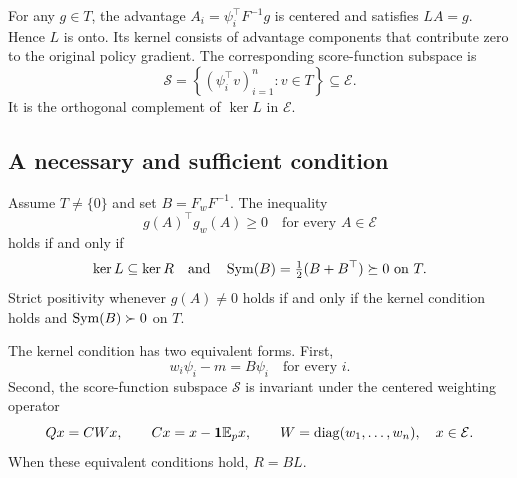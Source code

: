 For any $g\in T$, the advantage $A_i=\psi_i^\top F^{-1}g$ is centered and satisfies $LA=g$. Hence $L$ is onto. Its kernel consists of advantage components that contribute zero to the original policy gradient. The corresponding score-function subspace is
\[
\mathcal S=\left\{(\psi_i^\top v)_{i=1}^n:v\in T\right\}\subseteq\mathcal E.
\]
It is the orthogonal complement of $\ker L$ in $\mathcal E$.

\subsection{A necessary and sufficient condition}

\begin{theorem}
\label{thm:euclidean}
Assume $T\ne\{0\}$ and set $B=F_wF^{-1}$. The inequality
\begin{equation}
g(A)^\top g_w(A)\ge0\quad\text{for every }A\in\mathcal E
\label{eq:universal-alignment}
\end{equation}
holds if and only if
\begin{equation}
\ker L\subseteq\ker R
\quad\text{and}\quad
\operatorname{Sym}(B)=\tfrac12(B+B^\top)\succeq0\text{ on }T.
\label{eq:alignment-criterion}
\end{equation}
Strict positivity whenever $g(A)\ne0$ holds if and only if the kernel condition holds and $\operatorname{Sym}(B)\succ0$ on $T$.

The kernel condition has two equivalent forms. First,
\begin{equation}
w_i\psi_i-m=B\psi_i\quad\text{for every }i.
\label{eq:score-identity}
\end{equation}
Second, the score-function subspace $\mathcal S$ is invariant under the centered weighting operator
\[
Qx=CWx,\qquad Cx=x-\mathbf1\mathbb{E}_p x,\qquad W=\operatorname{diag}(w_1,\ldots,w_n),\quad x\in\mathcal E.
\]
When these equivalent conditions hold, $R=BL$.
\end{theorem}

